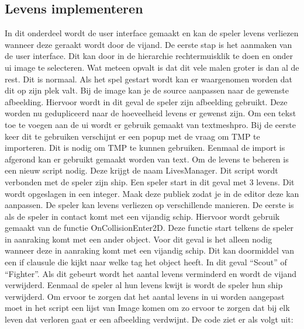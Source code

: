 \subsection{Levens implementeren}
In dit onderdeel wordt de user interface gemaakt en kan de speler levens verliezen wanneer deze geraakt wordt door de vijand.
De eerste stap is het aanmaken van de user interface. Dit kan door in de hierarchie rechtermuisklik te doen en onder ui image te selecteren. Wat meteen opvalt is dat dit vele malen groter is dan al de rest. Dit is normaal. Als het spel gestart wordt kan er waargenomen worden dat dit op zijn plek valt. Bij de image kan je de source aanpassen naar de gewenste afbeelding. Hiervoor wordt in dit geval de speler zijn afbeelding gebruikt. Deze worden nu gedupliceerd naar de hoeveelheid levens er gewenst zijn.
Om een tekst toe te voegen aan de ui wordt er gebruik gemaakt van textmeshpro. Bij de eerste keer dit te gebruiken verschijnt er een popup met de vraag om TMP te importeren. Dit is nodig om TMP te kunnen gebruiken. Eenmaal de import is afgerond kan er gebruikt gemaakt worden van text.
Om de levens te beheren is een nieuw script nodig. Deze krijgt de naam LivesManager. Dit script wordt verbonden met de speler zijn ship. Een speler start in dit geval met 3 levens. Dit wordt opgeslagen in een integer. Maak deze publiek zodat je in de editor deze kan aanpassen. De speler kan levens verliezen op verschillende manieren. De eerste is als de speler in contact komt met een vijandig schip. Hiervoor wordt gebruik gemaakt van de functie OnCollisionEnter2D. Deze functie start telkens de speler in aanraking komt met een ander object. Voor dit geval is het alleen nodig wanneer deze in aanraking komt met een vijandig schip. Dit kan doormiddel van een if clausule die kijkt naar welke tag het object heeft. In dit geval “Scout” of “Fighter”.  Als dit gebeurt wordt het aantal levens verminderd en wordt de vijand verwijderd. Eenmaal de speler al hun levens kwijt is wordt de speler hun ship verwijderd. 
Om ervoor te zorgen dat het aantal levens in ui worden aangepast moet in het script een lijst van Image komen om zo ervoor te zorgen dat bij elk leven dat verloren gaat er een afbeelding verdwijnt. De code ziet er als volgt uit:

